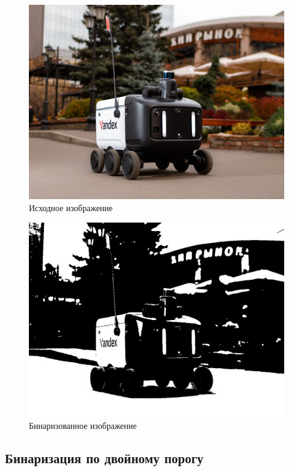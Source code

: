 \begin{figure}[ht]
    \includegraphics[width=\textwidth]{../source/yandex_delivery_robot.png}
    \caption{Исходное изображение}
    \label{fig:source_image}
\end{figure}

\begin{figure}[ht]
    \includegraphics[width=\textwidth]{../outputs/image_binarization.png}
    \caption{Бинаризованное изображение}
    \label{fig:р}
\end{figure}

\pagebreak

\subsection{Бинаризация по двойному порогу}

